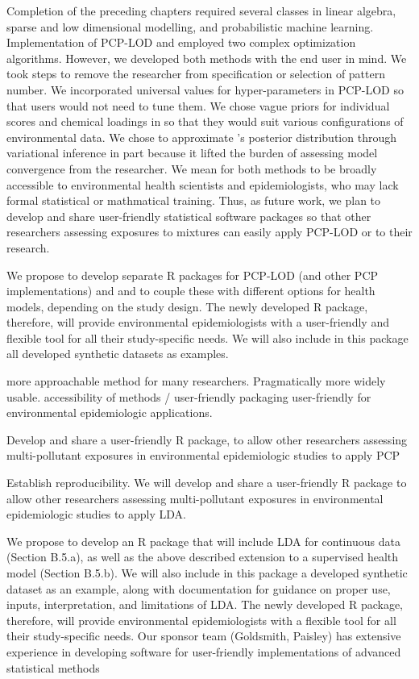 Completion of the preceding chapters required several classes in linear algebra, sparse and low dimensional modelling, and probabilistic machine learning. Implementation of PCP-LOD and \bnmf employed two complex optimization algorithms. However, we developed both methods with the end user in mind. We took steps to remove the researcher from specification or selection of pattern number. We incorporated universal values for hyper-parameters in PCP-LOD so that users would not need to tune them. We chose vague priors for individual scores and chemical loadings in \bnmf so that they would suit various configurations of environmental data. We chose to approximate \bnmfc's posterior distribution through variational inference in part because it lifted the burden of assessing model convergence from the researcher. We mean for both methods to be broadly accessible to environmental health scientists and epidemiologists, who may lack formal statistical or mathmatical training. Thus, as future work, we plan to develop and share user-friendly statistical software packages so that other researchers assessing exposures to mixtures can easily apply PCP-LOD or \bnmf to their research.

We propose to develop separate R packages for PCP-LOD (and other PCP implementations) and \bnmf and to couple these with different options for health models, depending on the study design. The newly developed R package, therefore, will provide environmental epidemiologists with a user-friendly and flexible tool for all their study-specific needs. We will also include in this package all developed synthetic datasets as examples.

more approachable method for many researchers. Pragmatically
more widely usable. 
accessibility of methods / user-friendly packaging
user-friendly for environmental epidemiologic applications. 

Develop and share a user-friendly R package, to allow other researchers assessing multi-pollutant exposures in environmental epidemiologic studies to apply PCP

Establish reproducibility. We will develop and share a user-friendly R package to allow other researchers assessing multi-pollutant exposures in environmental epidemiologic studies to apply LDA.

We propose to develop an R package that will include LDA for continuous data (Section B.5.a), as well as the above described extension to a supervised health model (Section B.5.b). We will also include in this package a developed synthetic dataset as an example, along with documentation for guidance on proper use, inputs, interpretation, and limitations of LDA. The newly developed R package, therefore, will provide environmental epidemiologists with a flexible tool for all their study-specific needs. Our sponsor team (Goldsmith, Paisley) has extensive experience in developing software for user-friendly implementations of advanced statistical methods

